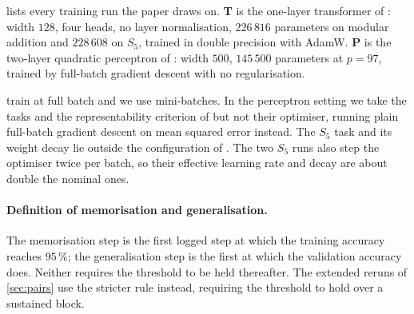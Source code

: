 \documentclass[twoside]{article}
\begin{document}
 lists every training run the paper draws on. \textbf{T} is the one-layer transformer of \citet{nanda2023progress}: width $128$, four heads, no
layer normalisation, $226\,816$ parameters on modular addition and $228\,608$ on $S_5$, trained
in double precision with AdamW.
\textbf{P} is the two-layer quadratic perceptron of \citet{gromov2023grokking}: width $500$,
$145\,500$ parameters at $p = 97$, trained by full-batch gradient descent with no regularisation.

\citet{nanda2023progress} train at full batch and we use mini-batches. In the perceptron setting we
take the tasks and the representability criterion of \citet{doshi2024grokking} but not their
optimiser, running plain full-batch gradient descent on mean squared error instead. The $S_5$ task
\citep{power2022grokking} and its weight decay lie outside the configuration of
\citet{nanda2023progress}. The two $S_5$ runs also step the optimiser twice per batch, so their
effective learning rate and decay are about double the nominal ones.

\paragraph{Definition of memorisation and generalisation.} The memorisation step is the first
logged step at which the training accuracy reaches $95\,\%$; the generalisation step is the first
at which the validation accuracy does. Neither requires the threshold to be held thereafter. The
extended reruns of \cref{sec:pairs} use the stricter rule instead, requiring the threshold to hold
over a sustained block.
\end{document}
